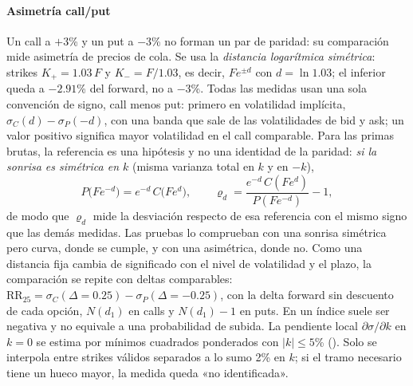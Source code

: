 
\paragraph{Asimetría call/put} Un call a $+3$\% y un put a $-3$\% no forman un par de paridad: su
comparación mide asimetría de precios de cola. Se usa la \emph{distancia logarítmica simétrica}: strikes
$K_+=1.03\,F$ y $K_-=F/1.03$, es decir, $Fe^{\pm d}$ con $d=\ln 1.03$; el inferior queda a $-2.91$\% del
forward, no a $-3$\%. Todas las medidas usan una sola convención de signo, call menos put: primero en
volatilidad implícita, $\sigma_C(d)-\sigma_P(-d)$, con una banda que sale de las volatilidades de bid y
ask; un valor positivo significa mayor volatilidad en el call comparable. Para las primas brutas, la
referencia es una hipótesis y no una identidad de la paridad: \emph{si la sonrisa es simétrica en $k$}
(misma varianza total en $k$ y en $-k$),
\begin{equation}
P\bigl(Fe^{-d}\bigr)=e^{-d}\,C\bigl(Fe^{d}\bigr),\qquad
\varrho_d=\frac{e^{-d}\,C(Fe^{d})}{P(Fe^{-d})}-1,
\label{eq:simetria_pc}
\end{equation}
de modo que $\varrho_d$ mide la desviación respecto de esa referencia con el mismo signo que las demás
medidas. Las pruebas lo comprueban con una sonrisa simétrica pero curva, donde se cumple, y con una
asimétrica, donde no. Como una distancia fija cambia de significado con el nivel de volatilidad y el
plazo, la comparación se repite con deltas comparables:
$\mathrm{RR}_{25}=\sigma_C(\Delta=0.25)-\sigma_P(\Delta=-0.25)$, con la delta forward sin descuento de
cada opción, $N(d_1)$ en calls y $N(d_1)-1$ en puts. En un índice suele ser negativa y no equivale a una
probabilidad de subida. La pendiente local
$\partial\sigma/\partial k$ en $k=0$ se estima por mínimos cuadrados ponderados con $|k|\le5$\%
(). Solo se interpola entre strikes válidos separados a lo sumo 2\% en
$k$; si el tramo necesario tiene un hueco mayor, la medida queda «no identificada».


